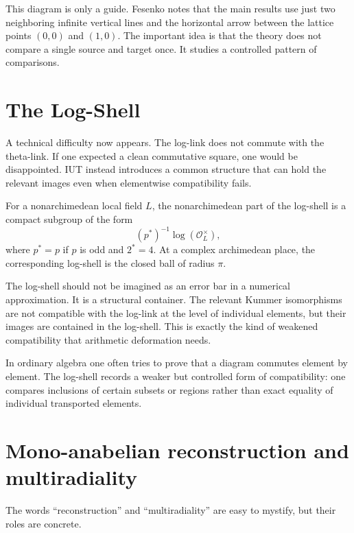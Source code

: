 This diagram is only a guide.  Fesenko notes that the main results use just two neighboring infinite vertical lines and the horizontal arrow between the lattice points \((0,0)\) and \((1,0)\).  The important idea is that the theory does not compare a single source and target once.  It studies a controlled pattern of comparisons.

\section{The Log-Shell}

A technical difficulty now appears.  The log-link does not commute with the theta-link.  If one expected a clean commutative square, one would be disappointed.  IUT instead introduces a common structure that can hold the relevant images even when elementwise compatibility fails.

\begin{definition}
For a nonarchimedean local field \(L\), the nonarchimedean part of the log-shell is a compact subgroup of the form
\[
  (p^{\ast})^{-1}\log(\mathcal O_L^{\times}),
\]
where \(p^{\ast}=p\) if \(p\) is odd and \(2^{\ast}=4\).  At a complex archimedean place, the corresponding log-shell is the closed ball of radius \(\pi\).
\end{definition}

The log-shell should not be imagined as an error bar in a numerical approximation.  It is a structural container.  The relevant Kummer isomorphisms are not compatible with the log-link at the level of individual elements, but their images are contained in the log-shell.  This is exactly the kind of weakened compatibility that arithmetic deformation needs.

\begin{remark}
In ordinary algebra one often tries to prove that a diagram commutes element by element.  The log-shell records a weaker but controlled form of compatibility: one compares inclusions of certain subsets or regions rather than exact equality of individual transported elements.
\end{remark}

\section{Mono-anabelian reconstruction and multiradiality}

The words ``reconstruction'' and ``multiradiality'' are easy to mystify, but their roles are concrete.

